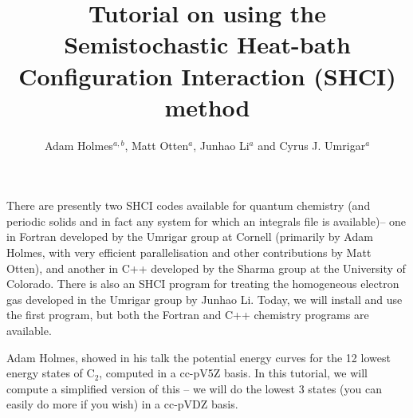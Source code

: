 \documentclass[12pt,aps,prb,groupedaddress,amsmath,amssymb]{revtex4-1}
\begin{document}
\title{Tutorial on using the Semistochastic Heat-bath Configuration Interaction (SHCI) method}

\author{Adam Holmes$^{a,b}$, Matt Otten$^a$, Junhao Li$^a$ and Cyrus J. Umrigar$^a$}

\maketitle

There are presently two SHCI codes available for quantum chemistry (and periodic solids and in fact any system for which an integrals file is available)-- one in Fortran developed by the Umrigar group
at Cornell (primarily by Adam Holmes, with very efficient parallelisation and other contributions by Matt Otten), and another in C++
developed by the Sharma group at the University of Colorado.  There is also an SHCI program for treating the
homogeneous electron gas developed in the Umrigar group by Junhao Li.
Today, we will install and use the first program, but both the Fortran and C++ chemistry programs are available.

Adam Holmes, showed in his talk the potential energy curves for the 12 lowest energy states of C$_2$, computed in a cc-pV5Z basis.
In this tutorial, we will compute a simplified version of this -- we will do the lowest 3 states (you can easily do more if you wish)
in a cc-pVDZ basis.
\end{document}
